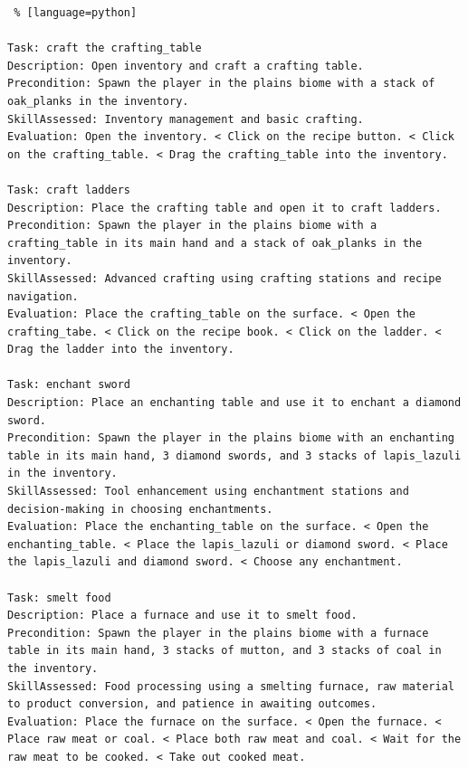 \begin{lstlisting} % [language=python]  

Task: craft the crafting_table
Description: Open inventory and craft a crafting table. 
Precondition: Spawn the player in the plains biome with a stack of oak_planks in the inventory. 
SkillAssessed: Inventory management and basic crafting.
Evaluation: Open the inventory. < Click on the recipe button. < Click on the crafting_table. < Drag the crafting_table into the inventory. 

Task: craft ladders 
Description: Place the crafting table and open it to craft ladders. 
Precondition: Spawn the player in the plains biome with a crafting_table in its main hand and a stack of oak_planks in the inventory. 
SkillAssessed: Advanced crafting using crafting stations and recipe navigation.
Evaluation: Place the crafting_table on the surface. < Open the crafting_tabe. < Click on the recipe book. < Click on the ladder. < Drag the ladder into the inventory. 

Task: enchant sword
Description: Place an enchanting table and use it to enchant a diamond sword. 
Precondition: Spawn the player in the plains biome with an enchanting table in its main hand, 3 diamond swords, and 3 stacks of lapis_lazuli in the inventory. 
SkillAssessed: Tool enhancement using enchantment stations and decision-making in choosing enchantments.
Evaluation: Place the enchanting_table on the surface. < Open the enchanting_table. < Place the lapis_lazuli or diamond sword. < Place the lapis_lazuli and diamond sword. < Choose any enchantment. 

Task: smelt food
Description: Place a furnace and use it to smelt food. 
Precondition: Spawn the player in the plains biome with a furnace table in its main hand, 3 stacks of mutton, and 3 stacks of coal in the inventory. 
SkillAssessed: Food processing using a smelting furnace, raw material to product conversion, and patience in awaiting outcomes. 
Evaluation: Place the furnace on the surface. < Open the furnace. < Place raw meat or coal. < Place both raw meat and coal. < Wait for the raw meat to be cooked. < Take out cooked meat. 


\end{lstlisting}

